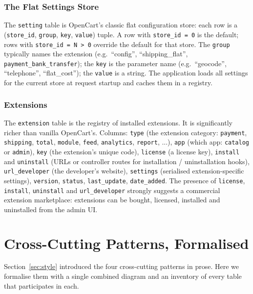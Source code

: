 \documentclass[11pt,a4paper]{article}
\begin{document}
\subsubsection{The Flat Settings Store}

The \texttt{setting} table is OpenCart's classic flat
configuration store: each row is a (\texttt{store\_id},
\texttt{group}, \texttt{key}, \texttt{value}) tuple. A row
with \texttt{store\_id = 0} is the default; rows with
\texttt{store\_id = N > 0} override the default for that
store. The \texttt{group} typically names the extension
(e.g.\ ``config'', ``shipping\_flat'',
\texttt{payment\_bank\_transfer}); the \texttt{key} is the
parameter name (e.g.\ ``geocode'', ``telephone'',
``flat\_cost''); the \texttt{value} is a string. The
application loads all settings for the current store at
request startup and caches them in a registry.

\subsubsection{Extensions}

The \texttt{extension} table is the registry of installed
extensions. It is significantly richer than vanilla
OpenCart's. Columns: \texttt{type} (the extension category:
\texttt{payment}, \texttt{shipping}, \texttt{total},
\texttt{module}, \texttt{feed}, \texttt{analytics},
\texttt{report}, ...), \texttt{app} (which app:
\texttt{catalog} or \texttt{admin}), \texttt{key} (the
extension's unique code), \texttt{license} (a license key),
\texttt{install} and \texttt{uninstall} (URLs or controller
routes for installation / uninstallation hooks),
\texttt{url\_developer} (the developer's website),
\texttt{settings} (serialised extension-specific settings),
\texttt{version}, \texttt{status}, \texttt{last\_update},
\texttt{date\_added}. The presence of \texttt{license},
\texttt{install}, \texttt{uninstall} and
\texttt{url\_developer} strongly suggests a commercial
extension marketplace: extensions can be bought, licensed,
installed and uninstalled from the admin UI.

\section{Cross-Cutting Patterns, Formalised}\label{sec:crosscutting}

Section~\ref{sec:style} introduced the four cross-cutting patterns
in prose. Here we formalise them with a single combined diagram and
an inventory of every table that participates in each.
\end{document}
